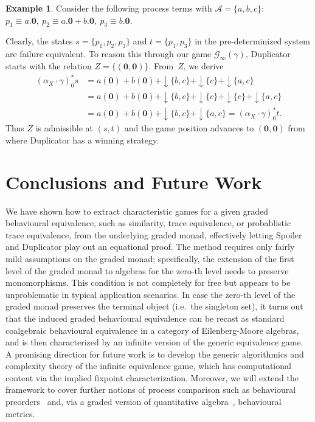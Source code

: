 \documentclass[sigconf,
			final%
			nonacm
                        ]{acmart}
\numberwithin{equation}{section}
\numberwithin{equation}{section}
\theoremstyle{plain}
\theoremstyle{definition}
\newtheorem{expl}[thm]{Example}
\newcommand{\A}{\mathcal{A}}            %
\newcommand{\CalG}{\mathcal{G}}             %
\newcommand{\dl}{\mathbf 0}
\begin{document}
\begin{expl}
  Consider the following process terms with $\A=\{a,b,c\}$:
  $
  p_1\equiv a.\dl,\ p_2\equiv a.\dl+b.\dl,\ p_3\equiv b.\dl.
  $

  Clearly, the states $s=\{p_1,p_2,p_3\}$ and $t=\{p_1,p_3\}$ in the pre-determinized system are failure equivalent. To reason this through our game $\CalG_\infty(\gamma)$, Duplicator starts with the relation $Z=\{(\dl,\dl)\}$. From~$Z$, we derive
  \begin{align*}
     (\alpha_X\cdot \gamma)^*_0 s &= a(\dl) + b(\dl) +  {\downarrow}\{b,c\} + {\downarrow}\{c\} + {\downarrow}\{a,c\} \\
    &=  a(\dl) + b(\dl) +   {\downarrow}\{b,c\} + {\downarrow}\{c\} + {\downarrow}\{c\} + {\downarrow}\{a,c\} \\
    &=  a(\dl) + b(\dl) + {\downarrow}\{b,c\} + {\downarrow}\{a,c\} =(\alpha_X\cdot \gamma)^*_0 t.
  \end{align*}
  Thus $Z$ is admissible at $(s,t)$ and the game position advances to $(\dl,\dl)$ from where Duplicator has a winning strategy.
\end{expl}


\section{Conclusions and Future Work}
\noindent We have shown how to extract characteristic games for a
given graded behavioural equivalence, such as similarity, trace
equivalence, or probablistic trace equivalence, from the underlying
graded monad, effectively letting Spoiler and Duplicator play out an
equational proof. The method requires only fairly mild assumptions on
the graded monad; specifically, the extension of the first level of
the graded monad to algebras for the zero-th level needs to preserve
monomorphisms. This condition is not completely for free but appears to
be unproblematic in typical application scenarios. In case the zero-th
level of the graded monad preserves the terminal object (i.e.~the
singleton set), it turns out that the induced graded behavioural
equivalence can be recast as standard coalgebraic behavioural
equivalence in a category of Eilenberg-Moore algebras, and is then
characterized by an infinite version of the generic equivalence
game. A promising direction for future work is to develop the generic
algorithmics and complexity theory of the infinite equivalence game,
which has computational content via the implied fixpoint
characterization. Moreover, we will extend the framework to cover
further notions of process comparison such as behavioural
preorders~\cite{FMS21a} and, via a graded version of quantitative
algebra~\cite{MPP16}, behavioural metrics.
\end{document}

